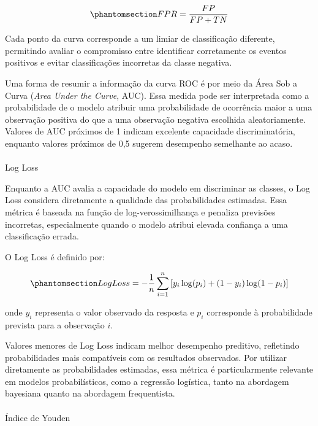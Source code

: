 \documentclass[
  brazilian,
  12pt,
  letterpaper,
  DIV=11,
  numbers=noendperiod]{scrartcl}
\makeatletter
\let\oldparagraph\paragraph
\renewcommand{\paragraph}{
    \@ifstar
      \xxxParagraphStar
      \xxxParagraphNoStar
  }
\newcommand{\xxxParagraphStar}[1]{\oldparagraph*{#1}\mbox{}}
\newcommand{\xxxParagraphNoStar}[1]{\oldparagraph{#1}\mbox{}}
\makeatother
\begin{document}
\begin{equation}\protect\phantomsection\label{eq-fpr}{
FPR=
\frac{FP}
{FP+TN}
}\end{equation}

Cada ponto da curva corresponde a um limiar de classificação diferente,
permitindo avaliar o compromisso entre identificar corretamente os
eventos positivos e evitar classificações incorretas da classe negativa.

Uma forma de resumir a informação da curva ROC é por meio da Área Sob a
Curva (\emph{Area Under the Curve}, AUC). Essa medida pode ser
interpretada como a probabilidade de o modelo atribuir uma probabilidade
de ocorrência maior a uma observação positiva do que a uma observação
negativa escolhida aleatoriamente. Valores de AUC próximos de 1 indicam
excelente capacidade discriminatória, enquanto valores próximos de 0,5
sugerem desempenho semelhante ao acaso.

\paragraph{Log Loss}\label{log-loss}

Enquanto a AUC avalia a capacidade do modelo em discriminar as classes,
o Log Loss considera diretamente a qualidade das probabilidades
estimadas. Essa métrica é baseada na função de log-verossimilhança e
penaliza previsões incorretas, especialmente quando o modelo atribui
elevada confiança a uma classificação errada.

O Log Loss é definido por:

\begin{equation}\protect\phantomsection\label{eq-logloss}{
LogLoss=
-\frac{1}{n}
\sum_{i=1}^{n}
\left[
y_i\log(p_i)
+
(1-y_i)\log(1-p_i)
\right]
}\end{equation}

onde \(y_i\) representa o valor observado da resposta e \(p_i\)
corresponde à probabilidade prevista para a observação \(i\).

Valores menores de Log Loss indicam melhor desempenho preditivo,
refletindo probabilidades mais compatíveis com os resultados observados.
Por utilizar diretamente as probabilidades estimadas, essa métrica é
particularmente relevante em modelos probabilísticos, como a regressão
logística, tanto na abordagem bayesiana quanto na abordagem
frequentista.

\paragraph{Índice de Youden}\label{uxedndice-de-youden}
\end{document}
